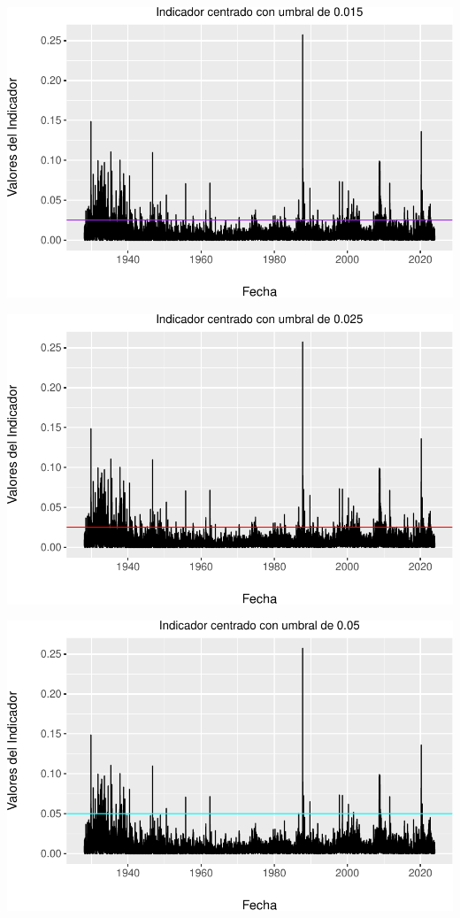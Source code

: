 \documentclass[
  oneside]{article}
\begin{document}
\includegraphics{Entrega_Laura_Montaldo_files/figure-latex/unnamed-chunk-21-1.pdf}

\includegraphics{Entrega_Laura_Montaldo_files/figure-latex/unnamed-chunk-22-1.pdf}

\includegraphics{Entrega_Laura_Montaldo_files/figure-latex/unnamed-chunk-23-1.pdf}
\end{document}
